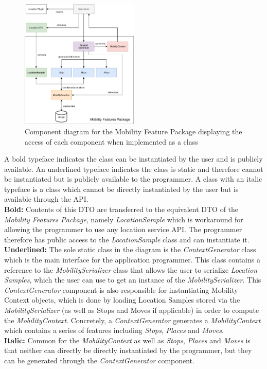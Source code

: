  \begin{figure}[h]
    \centering
    \includegraphics[width=0.5\textwidth]{images/diagrams/api-diagram.pdf}
    \caption{Component diagram for the Mobility Feature Package displaying the access of each component when implemented as a class}
    \label{fig:component-diagram}
\end{figure}
 
A bold typeface indicates the class can be instantiated by the user and is publicly available. An underlined typeface indicates the class is static and therefore cannot be instantiated but is publicly available to the programmer. A class with an italic typeface is a class which cannot be directly instantiated by the user but is available through the API. \\
 
\textbf{Bold:} Contents of this DTO are transferred to the equivalent DTO of the \textit{Mobility Features Package}, namely \textit{LocationSample} which is workaround for allowing the programmer to use any location service API. The programmer therefore has public access to the \textit{LocationSample} class and can instantiate it.\\

\textbf{Underlined:} The sole static class in the diagram is the \textit{ContextGenerator} class which is the main interface for the application programmer. This class contains a reference to the \textit{MobilitySerializer} class that allows the user to serialize \textit{Location Samples}, which the user can use to get an instance of the \textit{MobilitySerializer}. This \textit{ContextGenerator} component is also responsible for instantiating  Mobility Context objects, which is done by loading Location Samples stored via the \textit{MobilitySerializer} (as well as Stops and Moves if applicable) in order to compute the \textit{MobilityContext}. Concretely, a \textit{ContextGenerator} generates a \textit{MobilityContext} which contains a series of features including \textit{Stops}, \textit{Places} and \textit{Moves}.\\

\textbf{Italic:} Common for the \textit{MobilityContext} as well as \textit{Stops}, \textit{Places} and \textit{Moves} is that neither can directly be directly instantiated by the programmer, but they can be generated through the \textit{ContextGenerator} component. \\




